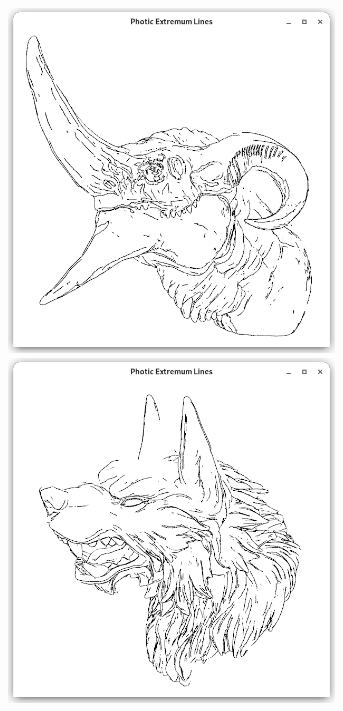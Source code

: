 \documentclass[9pt,fleqn,twoside,twocolumn]{stdglobal}
\begin{document}
\begin{figure}
\begin{subfigure}[t]{0.19\textwidth}
        \includegraphics[width=0.95\textwidth,trim={15px 15 15 50},clip]{images/results/dragon-head-pel.png}
        \includegraphics[width=0.95\textwidth,trim={15px 15 15 50},clip]{images/results/werewolf-pel.png}

\end{subfigure}
\end{figure}
\end{document}
